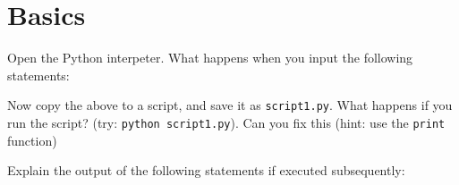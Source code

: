 \section{Basics} %
\label{sec:basics}

\begin{questions}
Open the Python interpeter.
What happens when you input the following statements:

    Now copy the above to a script, and save it as \texttt{script1.py}.
    What happens if you run the script? (try: \texttt{python script1.py}).
    Can you fix this (hint: use the \texttt{print} function)

    Explain the output of the following statements if executed subsequently:
\end{questions}
